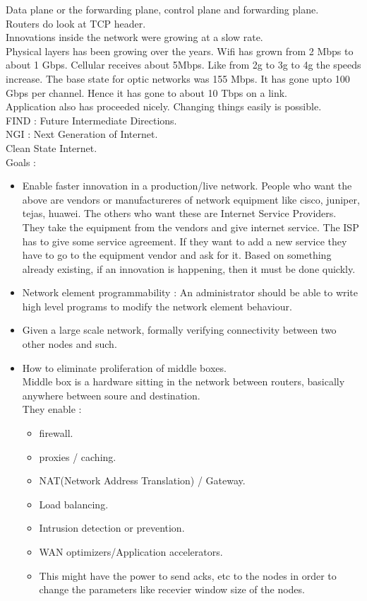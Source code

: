 \documentclass[solution,addpoints,12pt]{exam}
\begin{document}
Data plane or the forwarding plane, control plane and forwarding plane.\\
Routers do look at TCP header.\\

Innovations inside the network were growing at a slow rate.\\
Physical layers has been growing over the years. Wifi has
grown from 2 Mbps to about 1 Gbps. Cellular receives
about 5Mbps. Like from 2g to 3g to 4g the speeds increase.
The base state for optic networks was 155 Mbps. It has gone
upto 100 Gbps per channel. Hence it has gone to about 10 Tbps
on a link.\\

Application also has proceeded nicely. Changing things easily
is possible.\\
FIND : Future Intermediate Directions.\\
NGI : Next Generation of Internet.\\
Clean State Internet.\\
Goals :\\
\begin{itemize}
\item Enable faster innovation in a production/live network.
People who want the above are vendors or manufactureres of network
equipment like cisco, juniper, tejas, huawei. The others who want
these are Internet Service Providers. They take the equipment
from the vendors and give internet service. The ISP has to give
some service agreement. If they want to add a new service they
have to go to the equipment vendor and ask for it. Based on something
already existing, if an innovation is happening, then it must be done quickly.
\item Network element programmability : An administrator should
be able to write high level programs to modify the network element
behaviour.
\item Given a large scale network, formally verifying connectivity between two
other nodes and such.\\
\item How to eliminate proliferation of middle boxes.\\
Middle box is a hardware sitting in the network between routers,
basically anywhere between soure and destination.\\
They enable :
\begin{itemize}
\item firewall.
\item proxies / caching.
\item NAT(Network Address Translation) / Gateway.
\item Load balancing.
\item Intrusion detection or prevention.
\item WAN optimizers/Application accelerators.
\item This might have the power to send acks, etc to the nodes in order
to change the parameters like recevier window size of the nodes.
\end{itemize}
\end{itemize}
\end{document}
